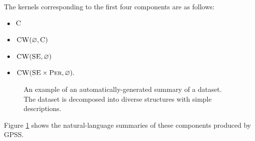 \documentclass{article}
\let\emptyset\varnothing
\begin{document}
The kernels corresponding to the first four components are as follows:
\vspace{-0.5\baselineskip}
\begin{itemize}
  \itemsep0em
  \item ${\textsc{C}}$
  \item $\kCW(\emptyset,\kC)$
  \item $\kCW(\kSE,\emptyset)$
  \item $\kCW(\kSE \times \kPer,\emptyset).$
\end{itemize}
\vspace{-\baselineskip}

\begin{figure}[h]
\centering
{}
\caption{
An example of an automatically-generated summary of a dataset.  The dataset is decomposed into diverse structures with simple descriptions.}
\label{fig:exec}
\end{figure}
Figure \ref{fig:exec} shows the natural-language summaries of these components produced by GPSS.
\end{document}
